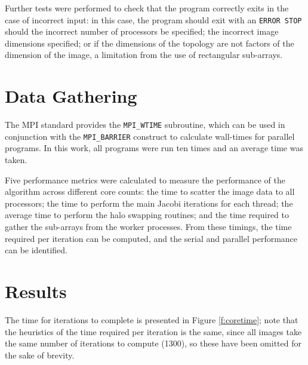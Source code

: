 \documentclass{article} %
\begin{document}
Further tests were performed to check that the program correctly exits in the case of incorrect input: in this case, the program should exit with an \texttt{ERROR STOP} should the incorrect number of processors be specified; the incorrect image dimensions specified; or if the dimensions of the topology are not factors of the dimension of the image, a limitation from the use of rectangular sub-arrays.

\section*{Data Gathering}

The MPI standard provides the \texttt{MPI\_WTIME} subroutine, which can be used in conjunction with the \texttt{MPI\_BARRIER} construct to calculate wall-times for parallel programs. 
In this work, all programs were run ten times and an average time was taken.

Five performance metrics were calculated to measure the performance of the algorithm across different core counts: the time to scatter the image data to all processors; the time to perform the main Jacobi iterations for each thread; the average time to perform the halo swapping routines; and the time required to gather the sub-arrays from the worker processes.
From these timings, the time required per iteration can be computed, and the serial and parallel performance can be identified.

\section*{Results}

The time for iterations to complete is presented in Figure \ref{f:coretime}; note that the heuristics of the time required per iteration is the same, since all images take the same number of iterations to compute (1300), so these have been omitted for the sake of brevity.
\end{document}
